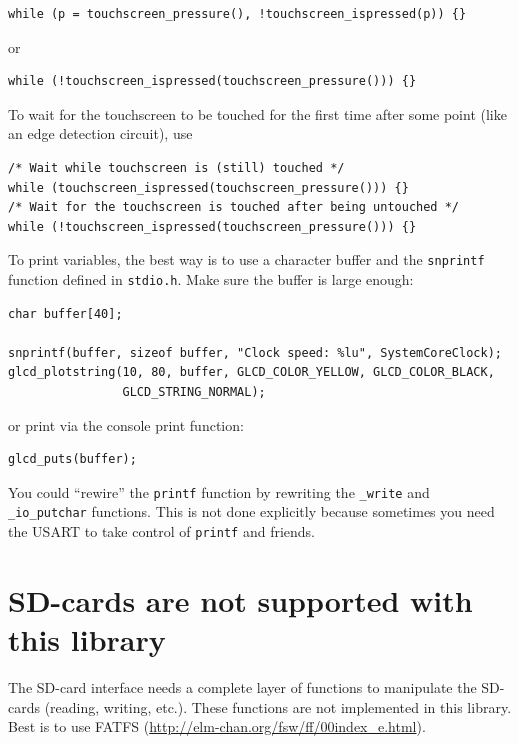 \documentclass[12pt]{article}
\begin{document}
\begin{lstlisting}
while (p = touchscreen_pressure(), !touchscreen_ispressed(p)) {}
\end{lstlisting}

or

\begin{lstlisting}
while (!touchscreen_ispressed(touchscreen_pressure())) {}
\end{lstlisting}

To wait for the touchscreen to be touched for the first time after some point (like an edge detection circuit), use

\begin{lstlisting}
/* Wait while touchscreen is (still) touched */
while (touchscreen_ispressed(touchscreen_pressure())) {}
/* Wait for the touchscreen is touched after being untouched */
while (!touchscreen_ispressed(touchscreen_pressure())) {}
\end{lstlisting}

To print variables, the best way is to use a character buffer and the \lstinline|snprintf| function defined in \lstinline|stdio.h|. Make sure the buffer is large enough:

\begin{lstlisting}
char buffer[40];

snprintf(buffer, sizeof buffer, "Clock speed: %lu", SystemCoreClock);
glcd_plotstring(10, 80, buffer, GLCD_COLOR_YELLOW, GLCD_COLOR_BLACK,
                GLCD_STRING_NORMAL);
\end{lstlisting}

or print via the console print function:

\begin{lstlisting}
glcd_puts(buffer);
\end{lstlisting}

You could ``rewire'' the \lstinline|printf| function by rewriting the \lstinline|_write| and \lstinline|_io_putchar| functions. This is not done explicitly because sometimes you need the USART to take control of \lstinline|printf| and friends.


\section{SD-cards are not supported with this library}
The SD-card interface needs a complete layer of functions to manipulate the SD-cards (reading, writing, etc.). These functions are not implemented in this library. Best is to use FATFS (\url{http://elm-chan.org/fsw/ff/00index_e.html}).
\end{document}
